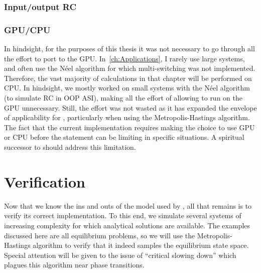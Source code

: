 \subsubsection{Input/output RC}
\subsubsection{GPU/CPU}
In hindsight, for the purposes of this thesis it was not necessary to go through all the effort to port \hotspice to the GPU.
In~\cref{ch:Applications}, I rarely use large systems, and often use the N\'eel algorithm for which multi-switching was not implemented.
Therefore, the vast majority of calculations in that chapter will be performed on CPU. 
In hindsight, we mostly worked on small systems with the N\'eel algorithm (to simulate RC in OOP ASI), making all the effort of allowing \hotspice to run on the GPU unnecessary. Still, the effort was not wasted as it has expanded the envelope of applicability for \hotspice, particularly when using the Metropolis-Hastings algorithm.
The fact that the current implementation requires making the choice to use GPU or CPU before the  statement can be limiting in specific situations. A spiritual successor to \hotspice should address this limitation.

\section{Verification} %
Now that we know the ins and outs of the model used by \hotspice, all that remains is to verify its correct implementation.
To this end, we simulate several systems of increasing complexity for which analytical solutions are available.
The examples discussed here are all equilibrium problems, so we will use the Metropolis-Hastings algorithm to verify that it indeed samples the equilibrium state space.
Special attention will be given to the issue of ``critical slowing down'' which plagues this algorithm near phase transitions.

